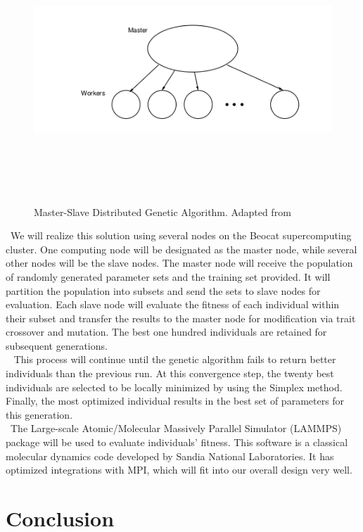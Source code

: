 \documentclass[letterpaper, 12pt]{article}
\begin{document}
\begin{flushleft}
 \begin{figure}[H]
 	\includegraphics[width=\linewidth,height=10cm,keepaspectratio]{model.png}
 	\caption[Master-Slave Genetic Algorithm Implementation]{Master-Slave Distributed Genetic Algorithm. Adapted from \cite{cantu1998survey}}
 	\label{fig:arch}
 \end{figure}

~\newline We will realize this solution using several nodes on the Beocat supercomputing cluster.   One computing node will be designated as the master node, while several other nodes will be the slave nodes.  The master node will receive the population of randomly generated parameter sets and the training set provided.  It will partition the population into subsets and send the sets to slave nodes for evaluation.  Each slave node will evaluate the fitness of each individual within their subset and transfer the results to the master node for modification via trait crossover and mutation. The best one hundred individuals are retained for subsequent generations.\\

~\newline
This process will continue until the genetic algorithm fails to return better individuals than the previous run.  At this convergence step, the twenty best individuals are selected to be locally minimized by using the Simplex method.  Finally, the most optimized individual results in the best set of parameters for this generation. \\

~\newline The Large-scale Atomic/Molecular Massively Parallel Simulator (LAMMPS) package will be used to evaluate individuals' fitness.  This software is a classical molecular dynamics code developed by Sandia National Laboratories.  It has optimized integrations with MPI, which will fit into our overall design very well.




\section*{Conclusion}

\newpage
\printbibliography

\end{flushleft}
\end{document}
